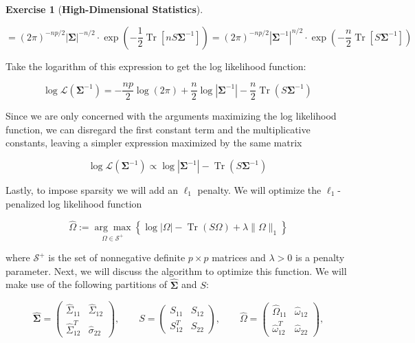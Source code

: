 \documentclass{article}
\theoremstyle{definition}
\newtheorem{exercise}{Exercise}
\theoremstyle{definition}
\theoremstyle{definition}
\theoremstyle{definition}
\theoremstyle{definition}
\DeclareMathOperator{\Tr}{Tr}
\begin{document}
\begin{exercise}[\textbf{High-Dimensional Statistics}]
\begin{enumerate}[(a)]
\[
= (2 \pi)^{-np/2} | \boldsymbol{\Sigma}|^{-n/2} \cdot \exp \left(- \frac{1}{2} \Tr \left[ nS \boldsymbol{\Sigma}^{-1}  \right]\right) = (2 \pi)^{-np/2} \left| \boldsymbol{\Sigma}^{-1} \right|^{n/2} \cdot \exp \left(- \frac{n}{2} \Tr \left[ S \boldsymbol{\Sigma}^{-1}  \right]\right)
\]

Take the logarithm of this expression to get the log likelihood function:

\[
\log \mathcal{L}(\boldsymbol{\Sigma}^{-1})  = - \frac{np}{2} \log (2 \pi) + \frac{n}{2}  \log \left| \boldsymbol{\Sigma}^{-1} \right| - \frac{n}{2} \Tr \left( S \boldsymbol{\Sigma}^{-1}  \right)\
\]

Since we are only concerned with the arguments maximizing the log likelihood function, we can disregard the first constant term and the multiplicative constants, leaving a simpler expression maximized by the same matrix

\[
\log \mathcal{L}(\boldsymbol{\Sigma}^{-1})  \propto \log \left| \boldsymbol{\Sigma}^{-1} \right| - \Tr \left( S \boldsymbol{\Sigma}^{-1}  \right)\
\]

Lastly, to impose sparsity we will add an \(\ell_1\) penalty. We will optimize the \(\ell_1\)-penalized log likelihood function

\begin{equation}\label{2018.screen.4.c.objective}
\hat{\Omega} := \underset{\Omega \in \mathcal{S}^+}{\arg \max} \left\{ \log \left| \Omega \right| - \Tr(S \Omega) + \lambda \lVert \Omega \rVert_1 \right\}
\end{equation}

where \( \mathcal{S}^+\) is the set of nonnegative definite \(p \times p\) matrices and \(\lambda > 0\) is a penalty parameter. Next, we will discuss the algorithm to optimize this function. We will make use of the following partitions of \(\boldsymbol{\hat{\Sigma}}\) and \(S\):

\begin{equation}\label{2018.screen.4.c.partitions}
\boldsymbol{\hat{\Sigma}} = \begin{pmatrix} 
\hat{\Sigma}_{11} & \hat{\Sigma}_{12} \\
\hat{\Sigma}_{12}^T & \hat{\sigma}_{22}
\end{pmatrix}, \qquad S = \begin{pmatrix} 
S_{11} & S_{12} \\
S_{12}^T & S_{22}
\end{pmatrix}, \qquad \hat{\Omega} = \begin{pmatrix} 
\hat{\Omega}_{11} & \hat{\omega}_{12} \\
\hat{\omega}_{12}^T & \hat{\omega}_{22}
\end{pmatrix},
\end{equation}


\end{enumerate}
\end{exercise}
\end{document}
